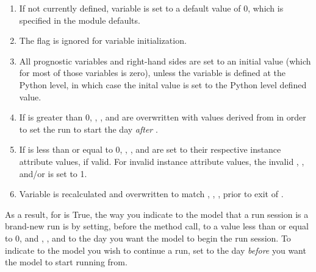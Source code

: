 \begin{enumerate}
\item If not currently defined,
	variable  is set to a default value of 0,
	which is specified in the module defaults.

\item The  flag is ignored for variable initialization.

\item All prognostic variables and right-hand sides
        are set to an
        initial value (which for most of those variables is zero),
	unless the variable is defined at the Python level, in which
	case the inital value is set to the Python level defined value.

\item If  is greater than 0, 
	, , and  are overwritten
        with values derived from  
	in order to set the run to start
	the day \emph{after} .

\item If  is less than or equal to 0, ,
	, and  are set to their respective
	instance attribute values, if valid.  For invalid instance
	attribute values, the invalid , ,
	and/or  is set to 1.

\item Variable  is recalculated
	and overwritten to match 
	, , , prior to exit of 
	.
\end{enumerate}

As a result, for  is True, the
way you indicate to the model that a run session is a brand-new run
is by setting, before the  method call,
 to a value less than or equal to 0, and ,
, and  to the day you want the model to
begin the run session.  To indicate to the model you wish to continue
a run, set  to the day \emph{before} you want the
model to start running from.

